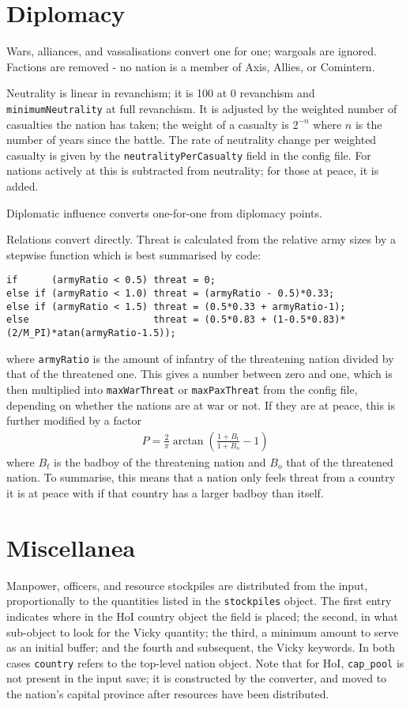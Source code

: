 \documentclass[12pt,ebook,oneside]{book}
\begin{document}
\section{Diplomacy}

Wars, alliances, and vassalisations convert one for one; wargoals are
ignored. Factions are removed - no nation is a member of Axis, Allies, or
Comintern. 

Neutrality is linear in revanchism; it is 100 at 0 revanchism and
\texttt{minimumNeutrality} at full revanchism. It is adjusted by the
weighted number of casualties the nation has taken; the weight of a
casualty is $2^{-n}$ where $n$ is the number of years since the
battle. The rate of neutrality change per weighted casualty is given by
the \texttt{neutralityPerCasualty} field in the config file. For
nations actively at this is subtracted from neutrality; for those at
peace, it is added. 

Diplomatic influence converts one-for-one from diplomacy points. 

Relations convert directly. Threat is calculated from the relative
army sizes by a stepwise function which is best summarised by code:
\begin{verbatim}
if      (armyRatio < 0.5) threat = 0;
else if (armyRatio < 1.0) threat = (armyRatio - 0.5)*0.33;
else if (armyRatio < 1.5) threat = (0.5*0.33 + armyRatio-1);
else                      threat = (0.5*0.83 + (1-0.5*0.83)*(2/M_PI)*atan(armyRatio-1.5));
\end{verbatim}
where \texttt{armyRatio} is the amount of infantry of the threatening
nation divided by that of the threatened one. This gives a number
between zero and one, which is then multiplied into
\texttt{maxWarThreat} or \texttt{maxPaxThreat} from the config
file, depending on whether the nations are at war or not. If they are
at peace, this is further modified by a factor
\begin{eqnarray*}
P = \frac{2}{\pi}\arctan\left(\frac{1+B_t}{1+B_o}-1\right)
\end{eqnarray*}
where $B_t$ is the badboy of the threatening nation and $B_o$ that of
the threatened nation. To summarise, this means that a nation only
feels threat from a country it is at peace with if that country has a
larger badboy than itself.

\section{Miscellanea}

Manpower, officers, and resource stockpiles are distributed 
from the input, proportionally to the quantities listed in the
\texttt{stockpiles} object. The first entry indicates where in the HoI
country object the field is placed; the second, in what sub-object to
look for the Vicky quantity; the third, a minimum amount to serve as
an initial buffer; and the fourth and subsequent, the Vicky keywords. In both
cases \texttt{country} refers to the top-level nation
object. Note that for HoI, \texttt{cap\_pool} is not present in the
input save; it is constructed by the converter, and moved to the
nation's capital province after resources have been distributed. 
\end{document}
